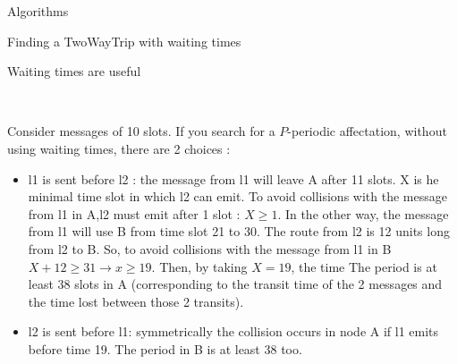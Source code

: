 \documentclass[a4paper,10pt]{report}
\begin{document}
\begin{chapter}{Algorithms}
\begin{section}{Finding a TwoWayTrip with waiting times}
\begin{subsection}{Waiting times are useful}
\begin{center}
{{{
  }}}\\
\end{center}

Consider messages of 10 slots. If you search for a $P$-periodic affectation, without using waiting times, there are 2 choices : 
\begin{itemize}
 \item l1 is sent before l2 : the message from l1 will leave A after 11 slots. X is he minimal time slot in which l2 can emit. 
 To avoid collisions with the message from l1 in A,l2 must emit after 1 slot :  $X\ge1$.
 In the other way, the message from l1 will use B from time slot 21 to 30. The route from l2 is 12 units long from l2 to B. So, to avoid collisions with 
 the message from l1 in B $X+12 \ge 31 \rightarrow x\ge 19$. Then, by taking $X=19$, the time
 The period is at least 38 slots in A (corresponding to the transit time of the 2 messages and the time lost between those 2 transits).
 \item l2 is sent before l1: symmetrically the collision occurs in node A if l1 emits before time 19. The period in B is at least 38 too.
\end{itemize}

\end{subsection}
\end{section}
\end{chapter}
\end{document}
